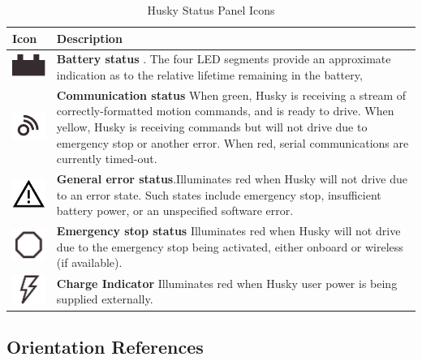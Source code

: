 \documentclass[]{clearpath-latex/clearpath-manual}
\begin{document}
\begin{table}[h]
	\centering
		\begin{tabular}{  >{\centering\arraybackslash}m{.1\linewidth}  m{.7\linewidth} } \hline
		\rowcolor{lightgrey} Icon    & Description  \\ \hline
		\includegraphics[width= 0.7 cm]{battery-mini.png} & \textbf{Battery status} . The four LED segments provide an approximate indication as to the relative lifetime remaining in the battery,   \\ \hline
		\includegraphics[width= 0.7 cm]{comm-mini.png} & \textbf{Communication status} When green, Husky is receiving a stream of correctly-formatted motion commands, and is ready to drive. When yellow, Husky is receiving commands but will not drive due to emergency stop or another error. When red, serial communications are currently timed-out. \\ \hline
		\includegraphics[width= 0.7 cm]{err-mini.png} & \textbf{General error status}.Illuminates red when Husky will not drive due to an error state. Such states include emergency stop, insufficient battery power, or an unspecified software error. \\ \hline
		\includegraphics[width= 0.7 cm]{estop-mini.png}& \textbf{Emergency stop status} Illuminates red when Husky will not drive due to the emergency stop being activated, either onboard or wireless (if available). \\ \hline
		\includegraphics[width= 0.7 cm]{charge-mini.png}& \textbf{Charge Indicator} Illuminates red when Husky user power is being supplied externally.\\ \hline
		\end{tabular}
	\caption{Husky Status Panel Icons}
	\label{status_panel}
\end{table}
\newpage

\subsection{Orientation References}
\end{document}
